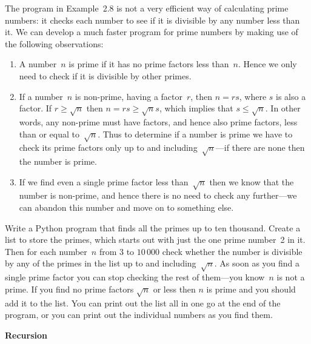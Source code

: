 \documentclass[12pt]{article}
\begin{document}
\begin{exercises}
\exskip The program in Example~2.8 is not a very efficient way of
calculating prime numbers: it checks each number to see if it is divisible
by any number less than it.  We can develop a much faster program for prime
numbers by making use of the following observations:
\begin{enumerate}\setlength{\itemsep}{0pt}
\item A number~$n$ is prime if it has no prime factors less than~$n$.
  Hence we only need to check if it is divisible by other primes.
\item If a number~$n$ is non-prime, having a factor~$r$, then $n=rs$, where
  $s$ is also a factor.  If $r\ge\sqrt{n}$ then $n = rs \ge \sqrt{n}s$,
  which implies that $s\le\sqrt{n}$.  In other words, any non-prime must
  have factors, and hence also prime factors, less than or equal
  to~$\sqrt{n}$.  Thus to determine if a number is prime we have to check
  its prime factors only up to and including~$\sqrt{n}$---if there are none
  then the number is prime.
\item If we find even a single prime factor less than~$\sqrt{n}$ then we
  know that the number is non-prime, and hence there is no need to check
  any further---we can abandon this number and move on to something else.
\end{enumerate}
Write a Python program that finds all the primes up to ten thousand.
Create a list to store the primes, which starts out with just the one prime
number~2 in it.  Then for each number~$n$ from 3 to $10\,000$ check whether
the number is divisible by any of the primes in the list up to and
including~$\sqrt{n}$.  As soon as you find a single prime factor you can
stop checking the rest of them---you know~$n$ is not a prime.  If you find
no prime factors $\sqrt{n}$ or less then $n$ is prime and you should add it
to the list.  You can print out the list all in one go at the end of the
program, or you can print out the individual numbers as you find them.



\exercise \textbf{Recursion}


\end{exercises}
\end{document}
